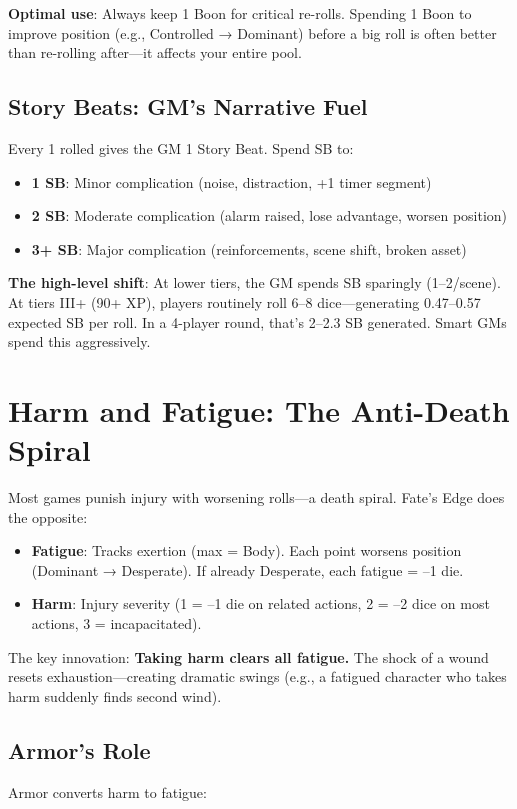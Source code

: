 \documentclass[11pt]{article}
\begin{document}
\textbf{Optimal use}: Always keep 1 Boon for critical re-rolls. Spending 1 Boon to improve position (e.g., Controlled → Dominant) before a big roll is often better than re-rolling after—it affects your entire pool.

\subsection{Story Beats: GM's Narrative Fuel}
Every 1 rolled gives the GM 1 Story Beat. Spend SB to:
\begin{itemize}
    \item \textbf{1 SB}: Minor complication (noise, distraction, +1 timer segment)
    \item \textbf{2 SB}: Moderate complication (alarm raised, lose advantage, worsen position)
    \item \textbf{3+ SB}: Major complication (reinforcements, scene shift, broken asset)
\end{itemize}

\textbf{The high-level shift}: At lower tiers, the GM spends SB sparingly (1–2/scene). At tiers III+ (90+ XP), players routinely roll 6–8 dice—generating 0.47–0.57 expected SB per roll. In a 4-player round, that's 2–2.3 SB generated. Smart GMs spend this aggressively.

\section{Harm and Fatigue: The Anti-Death Spiral}

Most games punish injury with worsening rolls—a death spiral. Fate's Edge does the opposite:
\begin{itemize}
    \item \textbf{Fatigue}: Tracks exertion (max = Body). Each point worsens position (Dominant → Desperate). If already Desperate, each fatigue = –1 die.
    \item \textbf{Harm}: Injury severity (1 = –1 die on related actions, 2 = –2 dice on most actions, 3 = incapacitated).
\end{itemize}

The key innovation: \textbf{Taking harm clears all fatigue.} The shock of a wound resets exhaustion—creating dramatic swings (e.g., a fatigued character who takes harm suddenly finds second wind).

\subsection{Armor's Role}
Armor converts harm to fatigue:
\end{document}
